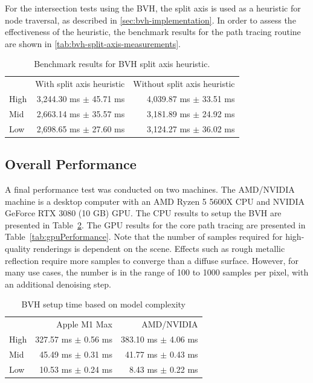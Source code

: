 For the intersection tests using the \gls{BVH}, the split axis is used as a heuristic for node traversal, as described in \autoref{sec:bvh-implementation}. In order to assess the effectiveness of the heuristic, the benchmark results for the path tracing routine are shown in \autoref{tab:bvh-split-axis-measurements}.

\begin{table}[H]
    \centering
    \begin{tabular}{@{}lrr@{}}
    \toprule
    & With split axis heuristic & Without split axis heuristic \\
    High & 3,244.30 ms $\pm$ 45.71 ms & 4,039.87 ms $\pm$ 33.51 ms \\
    Mid & 2,663.14 ms $\pm$ 35.57 ms & 3,181.89 ms $\pm$ 24.92 ms \\
    Low & 2,698.65 ms $\pm$ 27.60 ms & 3,124.27 ms $\pm$ 36.02 ms \\
    \bottomrule
    \end{tabular}
    \caption{Benchmark results for \gls{BVH} split axis heuristic.}
    \label{tab:bvh-split-axis-measurements}
\end{table}

\subsection*{Overall Performance}

A final performance test was conducted on two machines. The AMD/NVIDIA machine is a desktop computer with an AMD Ryzen 5 5600X \gls{CPU} and NVIDIA GeForce RTX 3080 (10 GB) \gls{GPU}. The \gls{CPU} results to setup the \gls{BVH} are presented in Table~\ref{tab:cpuPerformance}. The \gls{GPU} results for the core path tracing are presented in Table~\ref{tab:gpuPerformance}. Note that the number of samples required for high-quality renderings is dependent on the scene. Effects such as rough metallic reflection require more samples to converge than a diffuse surface. However, for many use cases, the number is in the range of 100 to 1000 samples per pixel, with an additional denoising step.

\begin{table}[H]
  \centering
  \begin{tabular}{lrr}
    \toprule
    & Apple M1 Max    & AMD/NVIDIA \\
    High     & 327.57 ms $\pm$ 0.56 ms     & 383.10 ms $\pm$ 4.06 ms \\
    Mid     & 45.49 ms $\pm$ 0.31 ms    & 41.77 ms $\pm$ 0.43 ms \\
    Low     & 10.53 ms $\pm$ 0.24 ms    & 8.43 ms $\pm$ 0.22 ms \\
    \bottomrule
  \end{tabular}
  \caption{\gls{BVH} setup time based on model complexity}
  \label{tab:cpuPerformance}
\end{table}

